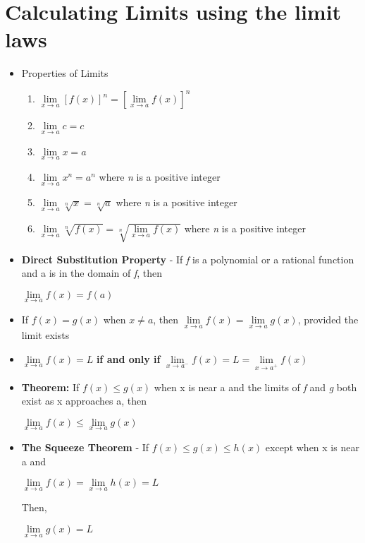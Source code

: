 \documentclass{report}
\begin{document}
		\section{Calculating Limits using the limit laws}
			\begin{itemize}\addtolength{\leftskip}{2em}
				\item Properties of Limits
				\begin{enumerate}\addtolength{\leftskip}{4em}
					\item $\lim\limits_{x\rightarrow a}[f(x)]^n=[\lim\limits_{x\rightarrow a}f(x)]^n$
					\item $\lim\limits_{x\rightarrow a}c=c$
					\item $\lim\limits_{x\rightarrow a}x=a$
					\item $\lim\limits_{x\rightarrow a}x^n=a^n$ where \textit{n} is a positive integer
					\item $\lim\limits_{x\rightarrow a}\sqrt[n]{x}=\sqrt[n]{a}$ where \textit{n} is a positive integer
					\item $\lim\limits_{x\rightarrow a}\sqrt[n]{f(x)}=\sqrt[n]{\lim\limits_{x\rightarrow a}f(x)}$ where \textit{n} is a positive integer
					
				\end{enumerate}\addtolength{\leftskip}{4em}
				\newpage
				\item \textbf{Direct Substitution Property} - If \textit{f} is a polynomial or a rational function and a is in the domain of \textit{f}, then 
				\begin{center}
				$\lim\limits_{x\rightarrow a}f(x)=f(a)$
				\end{center}
				\item If $f(x)=g(x)$ when $x\ne a$, then $\lim\limits_{x\rightarrow a}f(x)=\lim\limits_{x\rightarrow a}g(x)$, provided the limit exists
				\item $\lim\limits_{x \rightarrow a}f(x)=L$ \textbf{if and only if} $\lim\limits_{x \rightarrow a^-}f(x) =L=\lim\limits_{x \rightarrow a^+}f(x)$
				\item \textbf{Theorem: } If $f(x)\le g(x)$ when x is near a and the limits of \textit{f} and \textit{g} both exist as  x approaches a, then
					\begin{center}
					$\lim\limits_{x\rightarrow a}f(x)\le \lim\limits_{x\rightarrow a}g(x)$
					\end{center} 
				\item \textbf{The Squeeze Theorem} - If $f(x)\le g(x) \le h(x)$ except when x is near a and
					\begin{center}$\lim\limits_{x\rightarrow a}f(x)=\lim\limits_{x\rightarrow a}h(x)=L$\end{center}
					\begin{center}Then,\end{center}
					\begin{center}$\lim\limits_{x\rightarrow a}g(x)=L$\end{center}
			\end{itemize}
		\setcounter{section}{+4}
\end{document}
